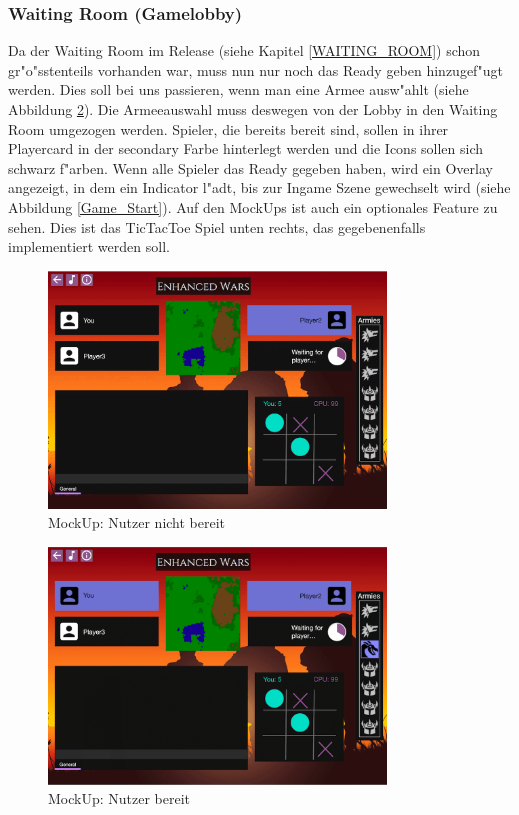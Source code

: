 \documentclass[12pt, titlepage]{scrartcl}
\newcommand{\RN}[1]{%
	\textup{\uppercase\expandafter{\romannumeral#1}}%
}
\begin{document}
		    \subsubsection{Waiting Room (Gamelobby)}
		        Da der Waiting Room im Release \RN{2} (siehe Kapitel \ref{WAITING_ROOM}) schon gr"o"sstenteils vorhanden war, muss nun nur noch das Ready geben hinzugef"ugt werden. Dies soll bei uns passieren, wenn man eine Armee ausw"ahlt (siehe Abbildung \ref{Ready}). Die Armeeauswahl muss deswegen von der Lobby in den Waiting Room umgezogen werden. Spieler, die bereits bereit sind, sollen in ihrer Playercard in der secondary Farbe hinterlegt werden und die Icons sollen sich schwarz f"arben. Wenn alle Spieler das Ready gegeben haben, wird ein Overlay angezeigt, in dem ein Indicator l"adt, bis zur Ingame Szene gewechselt wird (siehe Abbildung \ref{Game_Start}). Auf den MockUps ist auch ein optionales Feature zu sehen. Dies ist das TicTacToe Spiel unten rechts, das gegebenenfalls implementiert werden soll. \\
		        \begin{figure}[H] 
    				\centering
    				\includegraphics[width=0.8\textwidth]{images/mockUps/NotReady.png}
    				\caption{MockUp: Nutzer nicht bereit}
    				\label{Not_Ready}
			    \end{figure}
			    \begin{figure}[H] 
    				\centering
    				\includegraphics[width=0.8\textwidth]{images/mockUps/Ready.png}
    				\caption{MockUp: Nutzer bereit}
    				\label{Ready}
			    \end{figure}
\end{document}
